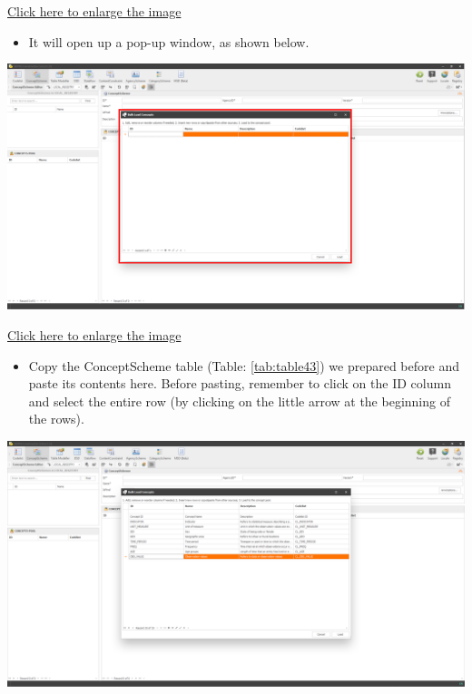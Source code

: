 \documentclass[
]{book}
\providecommand{\tightlist}{%
  \setlength{\itemsep}{0pt}\setlength{\parskip}{0pt}}
\begin{document}
\href{images/image102.png}{Click here to enlarge the image}

\begin{itemize}
\tightlist
\item
  It will open up a pop-up window, as shown below.
\end{itemize}

\begin{center}\includegraphics[width=1\linewidth]{./images/image104} \end{center}

\href{images/image104.png}{Click here to enlarge the image}

\begin{itemize}
\tightlist
\item
  Copy the ConceptScheme table (Table: \ref{tab:table43}) we prepared before and paste its contents here. Before pasting, remember to click on the ID column and select the entire row (by clicking on the little arrow at the beginning of the rows).
\end{itemize}

\begin{center}\includegraphics[width=1\linewidth]{./images/image106} \end{center}
\end{document}

